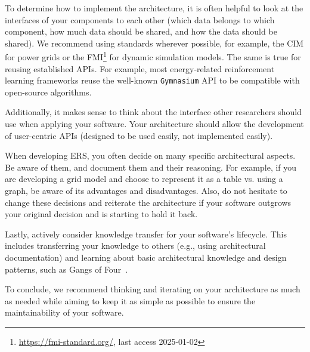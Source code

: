 To determine how to implement the architecture, it is often helpful to look at the interfaces of your components to each other (which data belongs to which component, how much data should be shared, and how the data should be shared). We recommend using standards wherever possible, for example, the \ac{CIM} \cite{uslar2012common} for power grids or the \ac{FMI}\footnote{\url{https://fmi-standard.org/}, last access 2025-01-02} for dynamic simulation models. The same is true for reusing established APIs. For example, most energy-related reinforcement learning frameworks \cite{Wolgast_OPF-Gym, hou2024rladnhighperformancedeepreinforcement, NEURIPS2023_ba748557} reuse the well-known \texttt{Gymnasium} API to be compatible with open-source algorithms.


Additionally, it makes sense to think about the interface other researchers should use when applying your software. Your architecture should allow the development of user-centric APIs (designed to be used easily, not implemented easily).

When developing \ac{ERS}, you often decide on many specific architectural aspects. Be aware of them, and document them and their reasoning. For example, if you are developing a grid model and choose to represent it as a table vs. using a graph, be aware of its advantages and disadvantages. Also, do not hesitate to change these decisions and reiterate the architecture if your software outgrows your original decision and is starting to hold it back.

Lastly, actively consider knowledge transfer for your software's lifecycle. This includes transferring your knowledge to others (e.g., using architectural documentation) and learning about basic architectural knowledge \cite{BASSSoftwareArch} and design patterns, such as Gangs of Four~\cite{GoFArch}. 

To conclude, we recommend thinking and iterating on your architecture as much as needed while aiming to keep it as simple as possible to ensure the maintainability of your software.

